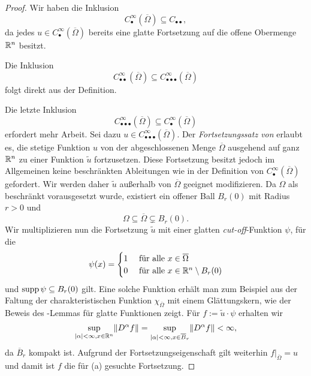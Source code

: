 \begin{proof}
  Wir haben die Inklusion
  $$
  C^\infty_\bullet(\overline\Omega) \subseteq C_{\bullet\bullet},
  $$ 
  da jedes $u\in C^\infty_\bullet(\overline\Omega)$ bereits eine glatte Fortsetzung auf die offene Obermenge $\mathbb{R}^n$ besitzt.

  Die Inklusion $$C^\infty_{\bullet\bullet}(\overline\Omega) \subseteq C^\infty_{\bullet\bullet\bullet}(\overline\Omega)$$ folgt direkt aus der Definition.
  
  Die letzte Inklusion $$C^\infty_{\bullet\bullet\bullet}(\overline\Omega) \subseteq C^\infty_{\bullet}(\overline\Omega)$$ erfordert mehr Arbeit.
  Sei dazu $u \in C^\infty_{\bullet\bullet\bullet}(\overline\Omega)$.
  Der \emph{Fortsetzungssatz von \stein} \cite[S.172, Proposition 2.2]{stein1970singular} erlaubt es, die stetige Funktion $u$ von der abgeschlossenen Menge $\overline\Omega$ ausgehend auf ganz $\mathbb{R}^n$ zu einer Funktion $\tilde u$ fortzusetzen.
  Diese Fortsetzung besitzt jedoch im Allgemeinen keine beschränkten Ableitungen wie in der Definition von $C^\infty_{\bullet}(\overline\Omega)$ gefordert.
  Wir werden daher $\tilde u$ außerhalb von $\overline\Omega$ geeignet modifizieren.
  Da $\Omega$ als beschränkt vorausgesetzt wurde, existiert ein offener Ball $B_r(0)$ mit Radius $r > 0$ und 
  $$
  \Omega \subseteq \overline\Omega \subsetneq B_r(0).
  $$ 
  Wir multiplizieren nun die Fortsetzung $\tilde u$ mit einer glatten \emph{cut-off}\hyp{}Funktion $\psi$, für die
  $$ 
  \psi(x) = \begin{cases}
                          1 &\text{ für alle } x \in \overline\Omega \\
                          0 &\text{ für alle } x \in \mathbb{R}^n \setminus B_r(0)
             \end{cases}
  $$
  und $\operatorname{supp} \psi \subseteq B_r(0)$ gilt.
  Eine solche Funktion erhält man zum Beispiel aus der Faltung der charakteristischen Funktion $\chi_{\overline\Omega}$ mit einem Glättungskern, wie der Beweis des \urysohn\hyp{}Lemmas für glatte Funktionen zeigt. \cite[S.88, Proposition 6.5]{folland2009ra}
  Für $f := \tilde u \cdot \psi$ erhalten wir
  $$
  \sup_{|\alpha| < \infty, x \in \mathbb{R}^n}\lVert  D^\alpha f \rVert
   = \sup_{|\alpha| < \infty, x \in \overline B_r}\lVert  D^\alpha f \rVert
   < \infty,
  $$
  da $\overline B_r$ kompakt ist.
  Aufgrund der Fortsetzungseigenschaft gilt weiterhin $f|_{\overline\Omega} = u$ und damit ist $f$ die für (a) gesuchte Fortsetzung.
\end{proof}

